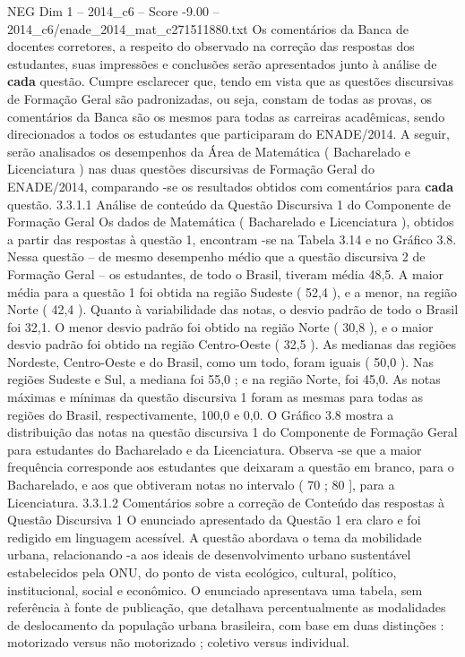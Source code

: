 \begin{textsample}{NEG Dim 1 – 2014\_c6 – Score -9.00 – 2014\_c6/enade\_2014\_mat\_c271511880.txt}
Os comentários da Banca de docentes corretores, a respeito do observado na correção das respostas dos estudantes, suas impressões e conclusões serão apresentados junto à análise de \textbf{cada} questão.
Cumpre esclarecer que, tendo em vista que as questões discursivas de Formação Geral são padronizadas, ou seja, constam de todas as provas, os comentários da Banca são os mesmos para todas as carreiras acadêmicas, sendo direcionados a todos os estudantes que participaram do ENADE/2014.
A seguir, serão analisados os desempenhos da Área de Matemática ( Bacharelado e Licenciatura ) nas duas questões discursivas de Formação Geral do ENADE/2014, comparando -se os resultados obtidos com comentários para \textbf{cada} questão. 3.3.1.1 Análise de conteúdo da Questão Discursiva 1 do Componente de Formação Geral Os dados de Matemática ( Bacharelado e Licenciatura ), obtidos a partir das respostas à questão 1, encontram -se na Tabela 3.14 e no Gráfico 3.8.
Nessa questão – de mesmo desempenho médio que a questão discursiva 2 de Formação Geral – os estudantes, de todo o Brasil, tiveram média 48,5.
A maior média para a questão 1 foi obtida na região Sudeste ( 52,4 ), e a menor, na região Norte ( 42,4 ).
Quanto à variabilidade das notas, o desvio padrão de todo o Brasil foi 32,1.
O menor desvio padrão foi obtido na região Norte ( 30,8 ), e o maior desvio padrão foi obtido na região Centro-Oeste ( 32,5 ).
As medianas das regiões Nordeste, Centro-Oeste e do Brasil, como um todo, foram iguais ( 50,0 ).
Nas regiões Sudeste e Sul, a mediana foi 55,0 ; e na região Norte, foi 45,0.
As notas máximas e mínimas da questão discursiva 1 foram as mesmas para todas as regiões do Brasil, respectivamente, 100,0 e 0,0.
O Gráfico 3.8 mostra a distribuição das notas na questão discursiva 1 do Componente de Formação Geral para estudantes do Bacharelado e da Licenciatura.
Observa -se que a maior frequência corresponde aos estudantes que deixaram a questão em branco, para o Bacharelado, e aos que obtiveram notas no intervalo ( 70 ; 80 ], para a Licenciatura. 3.3.1.2 Comentários sobre a correção de Conteúdo das respostas à Questão Discursiva 1 O enunciado apresentado da Questão 1 era claro e foi redigido em linguagem acessível.
A questão abordava o tema da mobilidade urbana, relacionando -a aos ideais de desenvolvimento urbano sustentável estabelecidos pela ONU, do ponto de vista ecológico, cultural, político, institucional, social e econômico.
O enunciado apresentava uma tabela, sem referência à fonte de publicação, que detalhava percentualmente as modalidades de deslocamento da população urbana brasileira, com base em duas distinções : motorizado versus não motorizado ; coletivo versus individual.

\end{textsample}
